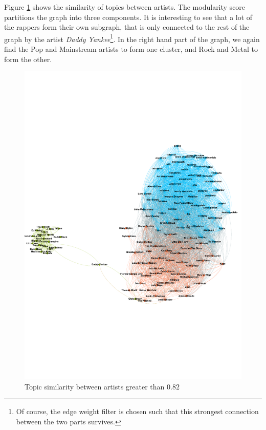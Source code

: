 \documentclass[10pt,a4paper]{article}
\begin{document}
		Figure \ref{fig:topicsimilarity} shows the similarity of topics between artists. The modularity score partitions the graph into three components. It is interesting to see that a lot of the rappers form their own subgraph, that is only connected to the rest of the graph by the artist \textit{Daddy Yankee}\footnote{Of course, the edge weight filter is chosen such that this strongest connection between the two parts survives.}. In the right hand part of the graph, we again find the Pop and Mainstream artists to form one cluster, and Rock and Metal to form the other.
		
		\begin{figure}[htb]
			\centering
			\includegraphics[trim=0mm 70mm 0mm 70mm, clip, width=\linewidth]{data/topic_similarity}
				\caption{Topic similarity between artists greater than $0.82$}
				\label{fig:topicsimilarity}
		\end{figure}
		
\end{document}
